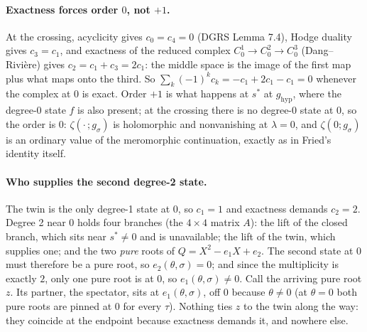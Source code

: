 \documentclass[11pt]{article}
\begin{document}
\paragraph{Exactness forces order $0$, not $+1$.} At the crossing, acyclicity gives
$c_0 = c_4 = 0$ (DGRS Lemma 7.4), Hodge duality gives $c_3 = c_1$, and exactness of the reduced
complex $C^1_0 \to C^2_0 \to C^3_0$ (Dang--Rivi\`ere) gives $c_2 = c_1 + c_3 = 2c_1$: the middle
space is the image of the first map plus what maps onto the third. So
$\sum_k (-1)^k c_k = -c_1 + 2c_1 - c_1 = 0$ whenever the complex at $0$ is exact. Order $+1$ is
what happens at $s^*$ at $g_{\mathrm{hyp}}$, where the degree-0 state $f$ is also present; at the
crossing there is no degree-0 state at $0$, so the order is $0$: $\zeta(\cdot\,; g_\sigma)$ is
holomorphic and nonvanishing at $\lambda = 0$, and $\zeta(0; g_\sigma)$ is an ordinary value of
the meromorphic continuation, exactly as in Fried's identity itself.

\paragraph{Who supplies the second degree-2 state.} The twin is the only degree-1 state at $0$,
so $c_1 = 1$ and exactness demands $c_2 = 2$. Degree 2 near $0$ holds four branches (the
$4\times 4$ matrix $A$): the lift of the closed branch, which sits near $s^* \neq 0$ and is
unavailable; the lift of the twin, which supplies one; and the two \emph{pure} roots of
$Q = X^2 - e_1 X + e_2$. The second state at $0$ must therefore be a pure root, so
$e_2(\theta,\sigma) = 0$; and since the multiplicity is exactly $2$, only one pure root is at
$0$, so $e_1(\theta,\sigma) \neq 0$. Call the arriving pure root $z$. Its partner, the spectator,
sits at $e_1(\theta,\sigma)$, off $0$ because $\theta \neq 0$ (at $\theta = 0$ both pure roots
are pinned at $0$ for every $\tau$). Nothing ties $z$ to the twin along the way: they coincide at
the endpoint because exactness demands it, and nowhere else.
\end{document}
